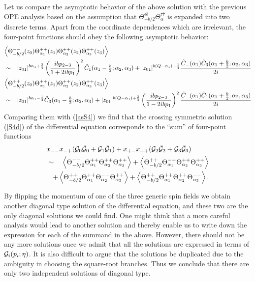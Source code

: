 \documentclass[a4paper,12pt]{article}
\newcommand{\vev}[1]{\left<{#1}\right>}
\newcommand{\tfrac}[2]{{\textstyle\frac{#1}{#2}}}
\newcommand{\cG}{{\cal G}}
\newcommand{\ep}{{\epsilon}}
\newcommand{\bep}{{\bar{\epsilon}}}
\newcommand{\btau}{{\bar{\tau}}}
\begin{document}
   Let us compare the asymptotic behavior of the above solution
 with the previous OPE analysis based on the assumption
 that $\Theta_{-b/2}^{\ep\bep}\Theta_\alpha^{\tau\btau}$
 is expanded into two discrete terms.
 Apart from the coordinate dependences which are irrelevant,
 the four-point functions should obey the following asymptotic behavior:
\begin{eqnarray}
\lefteqn{
  \vev{\Theta_{-b/2}^{--}(z_0)
       \Theta_{\alpha_1}^{++}(z_1)
       \Theta_{\alpha_2}^{++}(z_2)
       \Theta_{\alpha_3}^{++}(z_3)} }
 \nonumber \\
 &\sim&
  |z_{01}|^{b\alpha_1+\frac{3}{4}}
  \left(\frac{ibp_{2-3}}{1+2ibp_1}\right)^2
  \tilde{C}_1(\alpha_1-\tfrac{b}{2};\alpha_2,\alpha_3)
 +|z_{01}|^{b(Q-\alpha_1)-\frac{1}{4}}
   \frac{\tilde{C}_-(\alpha_1)
         \tilde{C}_3(\alpha_1+\tfrac{b}{2};\alpha_2,\alpha_3)}{2i}
 \nonumber \\
\lefteqn{
  \vev{\Theta_{-b/2}^{++}(z_0)
       \Theta_{\alpha_1}^{++}(z_1)
       \Theta_{\alpha_2}^{++}(z_2)
       \Theta_{\alpha_3}^{++}(z_3)} }
 \nonumber \\
 &\sim&
  |z_{01}|^{b\alpha_1-\frac{1}{4}}
        \tilde{C}_3(\alpha_1-\tfrac{b}{2};\alpha_2,\alpha_3)
 +|z_{01}|^{b(Q-\alpha_1)+\frac{3}{4}}
  \left(\frac{ibp_{2-3}}{1-2ibp_1}\right)^2
  \frac{\tilde{C}_-(\alpha_1)
        \tilde{C}_1(\alpha_1+\tfrac{b}{2};\alpha_2,\alpha_3)}
       {2i}
\end{eqnarray}
 Comparing them with (\ref{asS4}) we find that
 the crossing symmetric solution (\ref{S4d}) of the differential equation
 corresponds to the ``sum'' of four-point functions
\begin{eqnarray}
\lefteqn{
  x_{--}x_{-+}(\cG_0\bar{\cG}_0+\cG_1\bar{\cG}_1)
 +x_{+-}x_{++}(\cG_2\bar{\cG}_2+\cG_3\bar{\cG}_3)}
 \nonumber \\  &\sim&
    \vev{\Theta_{-b/2}^{--}
         \Theta_{\alpha_1}^{++}
         \Theta_{\alpha_2}^{++}
         \Theta_{\alpha_3}^{++}}
   +\vev{\Theta_{-b/2}^{++}
         \Theta_{\alpha_1}^{--}
         \Theta_{\alpha_2}^{++}
         \Theta_{\alpha_3}^{++}}
 \nonumber \\ && \hskip-4mm
   +\vev{\Theta_{-b/2}^{++}
         \Theta_{\alpha_1}^{++}
         \Theta_{\alpha_2}^{--}
         \Theta_{\alpha_3}^{++}}
   +\vev{\Theta_{-b/2}^{++}
         \Theta_{\alpha_1}^{++}
         \Theta_{\alpha_2}^{++}
         \Theta_{\alpha_3}^{--}}.
\end{eqnarray}

   By flipping the momentum of one of the three generic spin fields
 we obtain another diagonal type solution of the differential equation,
 and these two are the only diagonal solutions we could find.
 One might think that a more careful analysis would lead to
 another solution and thereby enable us to write down
 the expression for each of the summand in the above.
 However, there should not be any more solutions once we admit that
 all the solutions are expressed in terms of
 $\cG_i(p_i;\eta)$.
 It is also difficult to argue that the solutions be duplicated
 due to the ambiguity in choosing the square-root branches.
 Thus we conclude that there are only two independent solutions
 of diagonal type.
\end{document}
